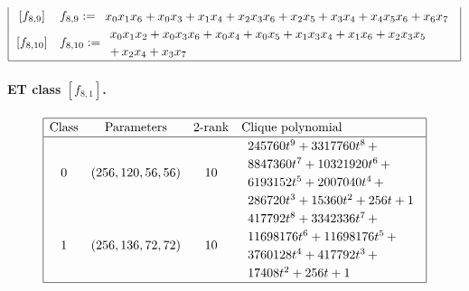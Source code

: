 \documentclass[12pt,a4paper]{article}
\begin{document}
\begin{align*}
\begin{array}{|cl|}
\,[f_{ 8 , 9 }] & f_{ 8 , 9 } :=
\begin{array}{l}
x_{0} x_{1} x_{6} + x_{0} x_{3} + x_{1} x_{4} + x_{2} x_{3} x_{6} + x_{2} x_{5} + x_{3} x_{4} +
x_{4} x_{5} x_{6} + x_{6} x_{7}
\end{array}
\\
\,[f_{ 8 , 10 }] & f_{ 8 , 10 } :=
\begin{array}{l}
x_{0} x_{1} x_{2} + x_{0} x_{3} x_{6} + x_{0} x_{4} + x_{0} x_{5} + x_{1} x_{3} x_{4} + x_{1} x_{6}
+ x_{2} x_{3} x_{5}
\\
+\, x_{2} x_{4} + x_{3} x_{7}
\end{array}
\\
\hline
\end{array}
\end{align*}
\normalsize{}
\paragraph*{ET class $[f_{8,1}]$.}

\small{}
\begin{align*}
\def\arraystretch{1.2}
\begin{array}{|cccl|}
\hline
\text{Class} &
\text{Parameters} &
\text{2-rank} &
\text{Clique polynomial}
\\
\hline
0 &
(256, 120, 56, 56) &
10 &
\begin{array}{l}
245760t^{9} + 3317760t^{8}
\,+
\\
 8847360t^{7} + 10321920t^{6}
\,+
\\
 6193152t^{5} + 2007040t^{4}
\,+
\\
 286720t^{3} + 15360t^{2} + 256t + 1
\end{array}
\\
1 &
(256, 136, 72, 72) &
10 &
\begin{array}{l}
417792t^{8} + 3342336t^{7}
\,+
\\
 11698176t^{6} + 11698176t^{5}
\,+
\\
 3760128t^{4} + 417792t^{3}
\,+
\\
 17408t^{2} + 256t + 1
\end{array}
\\
\hline
\end{array}
\end{align*}
\end{document}
